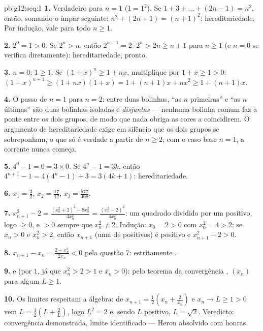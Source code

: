 \begin{solution}{pb:g12:seq:1}
\textbf{1.} Verdadeiro para $n = 1$ ($1 = 1^2$). Se
$1 + 3 + \dots + (2n - 1) = n^2$, então, somando o ímpar
seguinte: $n^2 + (2n + 1) = (n + 1)^2$: hereditariedade. Por
indução, vale para todo $n \geq 1$.

\textbf{2.} $2^0 = 1 > 0$. Se $2^n > n$, então
$2^{n+1} = 2 \cdot 2^n > 2n \geq n + 1$ para $n \geq 1$ (e
$n = 0$ se verifica diretamente): hereditariedade, pronto.

\textbf{3.} $n = 0$: $1 \geq 1$. Se $(1 + x)^n \geq 1 + nx$,
multiplique por $1 + x \geq 1 > 0$:
$(1 + x)^{n+1} \geq (1 + nx)(1 + x) = 1 + (n + 1)x + nx^2
\geq 1 + (n + 1)x$.

\textbf{4.} O passo de $n = 1$ para $n = 2$: entre duas
bolinhas, ``as $n$ primeiras'' e ``as $n$ últimas'' são duas
bolinhas isoladas e \emph{disjuntas} --- nenhuma bolinha comum
faz a ponte entre os dois grupos, de modo que nada obriga as
cores a coincidirem. O argumento de hereditariedade exige em
silêncio que os dois grupos se sobreponham, o que só é verdade
a partir de $n \geq 2$; com o caso base $n = 1$, a corrente
nunca começa.

\textbf{5.} $4^0 - 1 = 0 = 3 \times 0$. Se $4^n - 1 = 3k$,
então $4^{n+1} - 1 = 4(4^n - 1) + 3 = 3(4k + 1)$:
hereditariedade.

\textbf{6.} $x_1 = \frac32$, $x_2 = \frac{17}{12}$,
$x_3 = \frac{577}{408}$.

\textbf{7.} $x_{n+1}^2 - 2 = \frac{(x_n^2 + 2)^2 - 8x_n^2}
{4x_n^2} = \frac{(x_n^2 - 2)^2}{4 x_n^2}$: um quadrado dividido
por um positivo, logo $\geq 0$, e $> 0$ sempre que
$x_n^2 \neq 2$. Indução: $x_0 = 2 > 0$ com $x_0^2 = 4 > 2$; se
$x_n > 0$ e $x_n^2 > 2$, então $x_{n+1}$ (uma  de
positivos) é positivo e $x_{n+1}^2 - 2 > 0$.

\textbf{8.} $x_{n+1} - x_n = \frac{2 - x_n^2}{2x_n} < 0$ pela
questão 7: estritamente .

\textbf{9.}  e  (por $1$, já
que $x_n^2 > 2 > 1$ e $x_n > 0$): pelo teorema da convergência
, $(x_n)$  para algum $L \geq 1$.

\textbf{10.} Os limites respeitam a álgebra: de
$x_{n+1} = \frac12\left(x_n + \frac{2}{x_n}\right)$ e
$x_n \to L \geq 1 > 0$ vem
$L = \frac12\left(L + \frac2L\right)$, logo $L^2 = 2$ e, sendo
$L$ positivo, $L = \sqrt2$. Veredicto: convergência
demonstrada, limite identificado --- Heron absolvido com
honras.


\end{solution}
